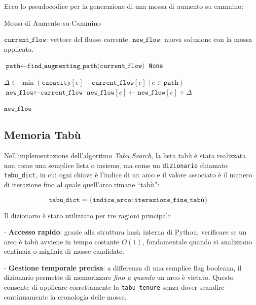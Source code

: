 \documentclass[12pt,a4paper]{article}
\begin{document}
Ecco lo pseudocodice per la generazione di una mossa di aumento su cammino:

\begin{algorithm}[H]
\caption{Mossa di Aumento su Cammino}
\label{alg:path_augmentation_move}
\begin{algorithmic}[1]
\REQUIRE $\texttt{current\_flow}$: vettore del flusso corrente.
\ENSURE $\texttt{new\_flow}$: nuova soluzione con la mossa applicata.

\STATE $ \texttt{path} \gets \texttt{find\_augmenting\_path(current\_flow)} $
    \RETURN \texttt{None}
\ENDIF

\STATE $ \Delta \gets \min(\texttt{capacity}[e] - \texttt{current\_flow}[e] \mid e \in \texttt{path}) $
\STATE $ \texttt{new\_flow} \gets \texttt{current\_flow} $
    \STATE $ \texttt{new\_flow}[e] \gets \texttt{new\_flow}[e] + \Delta $
\ENDFOR

\RETURN $\texttt{new\_flow}$
\end{algorithmic}
\end{algorithm}

\subsection{Memoria Tabù}

Nell'implementazione dell'algoritmo \textit{Tabu Search}, la lista tabù è stata realizzata non come una semplice lista o insieme, ma come un \texttt{dizionario} chiamato \texttt{tabu\_dict}, in cui ogni chiave è l'indice di un arco e il valore associato è il numero di iterazione fino al quale quell'arco rimane ``tabù'':

\[
\texttt{tabu\_dict} = \{ \texttt{indice\_arco}: \texttt{iterazione\_fine\_tabù} \}
\]

Il dizionario è stato utilizzato per tre ragioni principali:

- \textbf{Accesso rapido}: grazie alla struttura hash interna di Python, verificare se un arco è tabù avviene in tempo costante $O(1)$, fondamentale quando si analizzano centinaia o migliaia di mosse candidate.
    
    
- \textbf{Gestione temporale precisa}: a differenza di una semplice flag booleana, il dizionario permette di memorizzare \textit{fino a quando} un arco è vietato. Questo consente di applicare correttamente la \texttt{tabu\_tenure} senza dover scandire continuamente la cronologia delle mosse.
\end{document}

